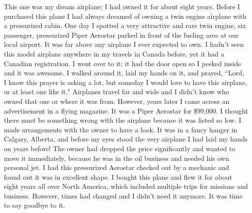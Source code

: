 \documentclass[oneside]{book}
\begin{document}
This one was my dream airplane; I had owned it for about eight years. Before I purchased this plane I had always dreamed of owning a twin engine airplane with a pressurized cabin. One day I spotted a very attractive and rare twin engine, six passenger, pressurized Piper Aerostar parked in front of the fueling area at our local airport. It was far above any airplane I ever expected to own. I hadn't seen this model airplane anywhere in my travels in Canada before, yet it had a Canadian registration. I went over to it; it had the door open so I peeked inside and it was awesome. I walked around it, laid my hands on it, and prayed, ``Lord, I know this prayer is asking a lot, but someday I would love to have this airplane, or at least one like it." Airplanes travel far and wide and I didn't know who owned that one or where it was from. However, years later I came across an advertisement in a flying magazine. It was a Piper Aerostar for \$99,000. I thought there must be something wrong with the airplane because it was listed so low. I made arrangements with the owner to have a look. It was in a fancy hanger in Calgary, Alberta, and before my eyes stood the very airplane I had laid my hands on years before! The owner had dropped the price significantly and wanted to move it immediately, because he was in the oil business and needed his own personal jet. I had this pressurized Aerostar checked out by a mechanic and found out it was in excellent shape. I bought this plane and flew it for about eight years all over North America, which included multiple trips for missions and business. However, times had changed and I didn't need it anymore. It was time to say goodbye to it.
\end{document}
